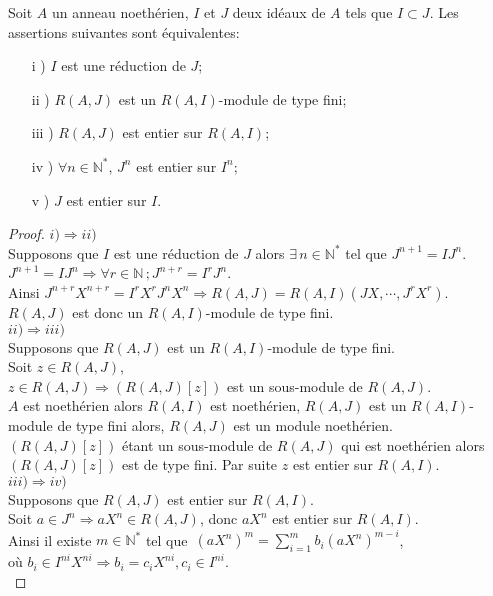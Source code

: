 \begin{maproposition}
	Soit $A$ un anneau noethérien, $I$ et $J$ deux idéaux de $A$ tels que $I \subset J$. Les assertions suivantes sont équivalentes: 
	\begin{enumerate}
		\item[i] ) $I$ est une réduction de $J$;
		\item[ii] ) $R(A,J)$ est un $R(A,I)$-module de type fini;
		\item[iii] ) $R(A,J)$ est entier sur $R(A,I)$;
		\item[iv] ) $\forall n \in \mathbb{N^*}$, $J^n$ est entier sur $I^n$;
		\item[v] ) $J$ est entier sur $I$.
	\end{enumerate}
\end{maproposition}
\begin{proof}
	$i) \Rightarrow ii)$ \\
	Supposons que $I$ est une réduction de $J$ alors $\exists \, n \in \mathbb{N}^{*}$ tel que $J^{n+1} = IJ^{n}$.\\
	$J^{n+1} = IJ^{n} \Rightarrow \forall r \in \mathbb{N} \, ; J^{n+r} = I^rJ^{n}$.\\
	Ainsi $J^{n+r} X^{n+r} = I^r X^rJ^{n} X^n \Rightarrow R(A,J) = R(A,I)(JX, \cdots ,J^rX^r)$.\\
	$R(A,J)$ est donc un $R(A,I)$-module de type fini.\\
	$ii) \Rightarrow iii)$ \\
	Supposons que $R(A,J)$ est un $R(A,I)$-module de type fini.\\
	Soit $z \in R(A,J)$,\\
	$z \in R(A,J) \Rightarrow (R(A,J)[z])$ est un sous-module de $R(A,J)$.\\
	$A$ est noethérien alors $R(A,I)$ est noethérien, $R(A,J)$ est un $R(A,I)$-module de type fini alors, $R(A,J)$ est un module noethérien.\\
	$(R(A,J)[z])$ étant un sous-module de $R(A,J)$ qui est noethérien alors $(R(A,J)[z])$ est de type fini. Par suite $z$ est entier sur $R(A,I)$.\\
	$iii) \Rightarrow iv)$ \\
	Supposons que $R(A,J)$ est entier sur $R(A,I)$.\\
	Soit $a \in J^n \Rightarrow aX^n \in R(A,J)$, donc $aX^n$ est entier sur $R(A,I)$.\\
	Ainsi il existe $m \in \mathbb{N^*}$  tel que  $\, (aX^n)^m = \displaystyle \sum_{i=1}^{m}{b_i (aX^n)^{m-i}}$,\\ où $b_i \in I^{ni} X^{ni} \Rightarrow b_i = c_i X^{ni} , c_i \in I^{ni}$.\\

\end{proof}
